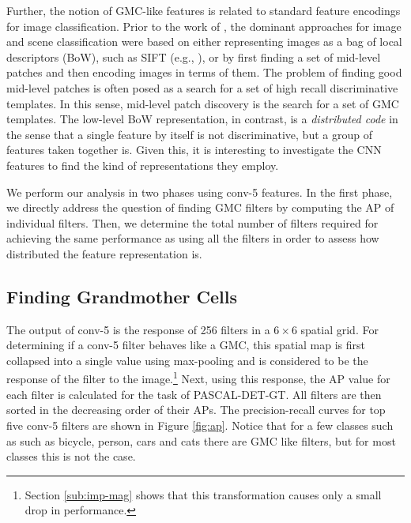 Further, the notion of GMC-like features is related to standard feature encodings for image classification.
Prior to the work of \cite{Kriz}, the dominant approaches for image and scene classification were based on either representing images as a bag of local descriptors (BoW), such as SIFT (e.g., \cite{lazebnik2006beyond}), or by first finding a set of mid-level patches \cite{Blocks,Mid1} and then encoding images in terms of them. 
The problem of finding good mid-level patches is often posed as a search for a set of high recall discriminative templates. 
In this sense, mid-level patch discovery is the search for a set of GMC templates. 
The low-level BoW representation, in contrast, is a \emph{distributed code} in the sense that a single feature by itself is not discriminative, but a group of features taken together is.
Given this, it is interesting to investigate the CNN features to find the kind of representations they employ.

We perform our analysis in two phases using conv-5 features. In the first phase, we directly address the question of finding GMC filters by computing the AP of individual filters. Then, we determine the total number of filters required for achieving the same performance as using all the filters in order to assess how distributed the feature representation is.

\subsection{Finding Grandmother Cells}
\label{sub:class-specific-unit}
The output of conv-5 is the response of 256 filters in a $6\times 6$ spatial grid. For determining if a conv-5 filter behaves like a GMC, this spatial map is first collapsed into a single value using max-pooling and is considered to be the response of the filter to the image.\footnote{Section \ref{sub:imp-mag} shows that this transformation causes only a small drop in performance.} Next, using this response, the AP value for each filter is calculated for the task of PASCAL-DET-GT. All filters are then sorted in the decreasing order of their APs. The precision-recall curves for top five conv-5 filters are shown in Figure \ref{fig:ap}. Notice that for a few classes such as such as bicycle, person, cars and cats there are GMC like filters, but for most classes this is not the case.   

